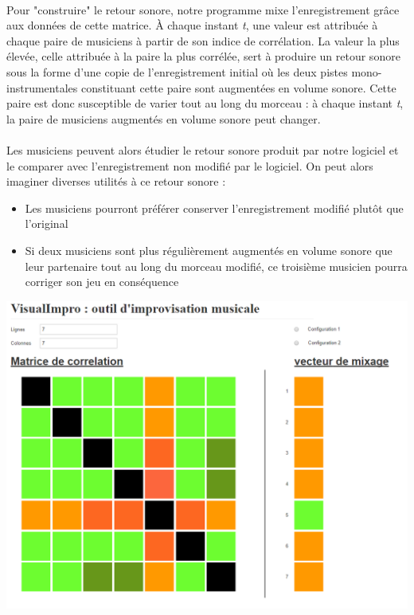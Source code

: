 \documentclass{article}
\begin{document}
\paragraph{}
Pour "construire" le retour sonore, notre programme mixe l'enregistrement
grâce aux données de cette matrice. À chaque instant \textit{t}, une valeur
est attribuée à chaque paire de musiciens à partir de son indice de
corrélation. La valeur la plus élevée, celle attribuée à la paire la plus
corrélée, sert à produire un retour sonore sous la forme d'une copie de
l'enregistrement initial où les deux pistes mono-instrumentales constituant
cette paire sont augmentées en volume sonore. Cette paire est donc susceptible
de varier tout au long du morceau : à chaque instant \textit{t}, la paire de
musiciens augmentés en volume sonore peut changer.
\paragraph{}
Les musiciens peuvent alors étudier le retour sonore produit par notre logiciel
et le comparer avec l'enregistrement non modifié par le logiciel. On peut
alors imaginer diverses utilités à ce retour sonore :
\begin{itemize}
 \item Les musiciens pourront préférer conserver l'enregistrement modifié plutôt
       que l'original
 \item Si deux musiciens sont plus régulièrement augmentés en volume sonore que
       leur partenaire tout au long du morceau modifié, ce troisième musicien pourra
       corriger son jeu en conséquence
\end{itemize}


\centering
\includegraphics[scale=0.30]{proto_2.png}
\end{document}
